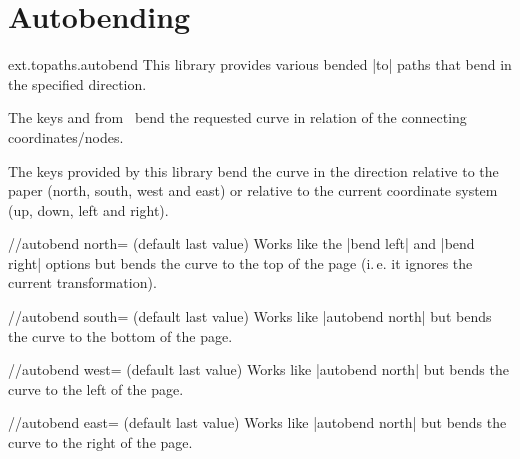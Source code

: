 %
%
%

\section{Autobending}
\label{library:topaths.autobend}
\begin{tikzlibrary}{ext.topaths.autobend}
  This library provides various bended |to| paths
  that bend in the specified direction.
  
\end{tikzlibrary}

The keys 
and  from \tikzname\ 
bend the requested curve in relation of the connecting
coordinates/nodes.

The keys provided by this library bend the curve in the direction relative
to the paper (north, south, west and east) or relative to the current
coordinate system (up, down, left and right).

\begin{key}{/\tikzext/autobend north= (default \normalfont last value)}
  Works like the |bend left| and |bend right| options
  but bends the curve to the top of the page (i.\,e. it ignores the current transformation).
\end{key}
\begin{key}{/\tikzext/autobend south= (default \normalfont last value)}
  Works like |autobend north| but bends the curve to the bottom of the page.
\end{key}
\begin{key}{/\tikzext/autobend west= (default \normalfont last value)}
  Works like |autobend north| but bends the curve to the left of the page.
\end{key}
\begin{key}{/\tikzext/autobend east= (default \normalfont last value)}
  Works like |autobend north| but bends the curve to the right of the page.
\end{key}

